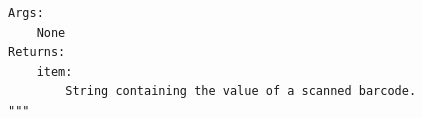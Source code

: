 \documentclass[12pt]{article}
\begin{document}
{\begin{verbatim}
Args: 
    None
Returns:
    item:
        String containing the value of a scanned barcode.
"""
\end{verbatim}

}
\end{document}
